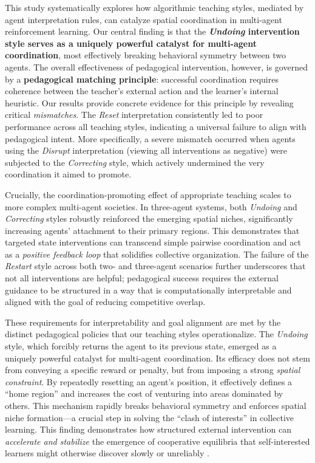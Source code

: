 \documentclass[10pt,letterpaper]{article}
\begin{document}
This study systematically explores how algorithmic teaching styles, mediated by agent interpretation rules, can catalyze spatial coordination in multi-agent reinforcement learning. Our central finding is that the \textbf{\emph{Undoing} intervention style serves as a uniquely powerful catalyst for multi-agent coordination}, most effectively breaking behavioral symmetry between two agents. The overall effectiveness of pedagogical intervention, however, is governed by a \textbf{pedagogical matching principle}: successful coordination requires coherence between the teacher's external action and the learner's internal heuristic. Our results provide concrete evidence for this principle by revealing critical \emph{mismatches}. The \emph{Reset} interpretation consistently led to poor performance across all teaching styles, indicating a universal failure to align with pedagogical intent. More specifically, a severe mismatch occurred when agents using the \emph{Disrupt} interpretation (viewing all interventions as negative) were subjected to the \emph{Correcting} style, which actively undermined the very coordination it aimed to promote.

Crucially, the coordination-promoting effect of appropriate teaching scales to more complex multi-agent societies. In three-agent systems, both \emph{Undoing} and \emph{Correcting} styles robustly reinforced the emerging spatial niches, significantly increasing agents' attachment to their primary regions. This demonstrates that targeted state interventions can transcend simple pairwise coordination and act as a \textit{positive feedback loop} that solidifies collective organization. The failure of the \emph{Restart} style across both two- and three-agent scenarios further underscores that not all interventions are helpful; pedagogical success requires the external guidance to be structured in a way that is computationally interpretable and aligned with the goal of reducing competitive overlap.

These requirements for interpretability and goal alignment are met by the distinct pedagogical policies that our teaching styles operationalize. The \emph{Undoing} style, which forcibly returns the agent to its previous state, emerged as a uniquely powerful catalyst for multi-agent coordination. Its efficacy does not stem from conveying a specific reward or penalty, but from imposing a strong \emph{spatial constraint}. By repeatedly resetting an agent's position, it effectively defines a ``home region'' and increases the cost of venturing into areas dominated by others. This mechanism rapidly breaks behavioral symmetry and enforces spatial niche formation---a crucial step in solving the ``clash of interests'' in collective learning. This finding demonstrates how structured external intervention can \emph{accelerate and stabilize} the emergence of cooperative equilibria that self-interested learners might otherwise discover slowly or unreliably \cite{austerweil2015impact}.
\end{document}
